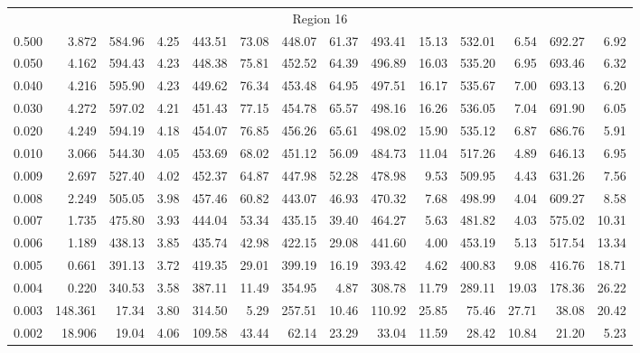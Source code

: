 \begin{tabular}{@{}lrrrrrrrrrrrrr@{}}
\midrule
\multicolumn{14}{c}{Region 16} \\
\cmidrule{1-14}
0.500 & 3.872 & 584.96 & 4.25 & 443.51 & 73.08 & 448.07 & 61.37 & 493.41 & 15.13 & 532.01 & 6.54 & 692.27 & 6.92 \\
0.050 & 4.162 & 594.43 & 4.23 & 448.38 & 75.81 & 452.52 & 64.39 & 496.89 & 16.03 & 535.20 & 6.95 & 693.46 & 6.32 \\
0.040 & 4.216 & 595.90 & 4.23 & 449.62 & 76.34 & 453.48 & 64.95 & 497.51 & 16.17 & 535.67 & 7.00 & 693.13 & 6.20 \\
0.030 & 4.272 & 597.02 & 4.21 & 451.43 & 77.15 & 454.78 & 65.57 & 498.16 & 16.26 & 536.05 & 7.04 & 691.90 & 6.05 \\
0.020 & 4.249 & 594.19 & 4.18 & 454.07 & 76.85 & 456.26 & 65.61 & 498.02 & 15.90 & 535.12 & 6.87 & 686.76 & 5.91 \\
0.010 & 3.066 & 544.30 & 4.05 & 453.69 & 68.02 & 451.12 & 56.09 & 484.73 & 11.04 & 517.26 & 4.89 & 646.13 & 6.95 \\
0.009 & 2.697 & 527.40 & 4.02 & 452.37 & 64.87 & 447.98 & 52.28 & 478.98 & 9.53 & 509.95 & 4.43 & 631.26 & 7.56 \\
0.008 & 2.249 & 505.05 & 3.98 & 457.46 & 60.82 & 443.07 & 46.93 & 470.32 & 7.68 & 498.99 & 4.04 & 609.27 & 8.58 \\
0.007 & 1.735 & 475.80 & 3.93 & 444.04 & 53.34 & 435.15 & 39.40 & 464.27 & 5.63 & 481.82 & 4.03 & 575.02 & 10.31 \\
0.006 & 1.189 & 438.13 & 3.85 & 435.74 & 42.98 & 422.15 & 29.08 & 441.60 & 4.00 & 453.19 & 5.13 & 517.54 & 13.34 \\
0.005 & 0.661 & 391.13 & 3.72 & 419.35 & 29.01 & 399.19 & 16.19 & 393.42 & 4.62 & 400.83 & 9.08 & 416.76 & 18.71 \\
0.004 & 0.220 & 340.53 & 3.58 & 387.11 & 11.49 & 354.95 & 4.87 & 308.78 & 11.79 & 289.11 & 19.03 & 178.36 & 26.22 \\
0.003 & 148.361 & 17.34 & 3.80 & 314.50 & 5.29 & 257.51 & 10.46 & 110.92 & 25.85 & 75.46 & 27.71 & 38.08 & 20.42 \\
0.002 & 18.906 & 19.04 & 4.06 & 109.58 & 43.44 & 62.14 & 23.29 & 33.04 & 11.59 & 28.42 & 10.84 & 21.20 & 5.23 \\


\end{tabular}
